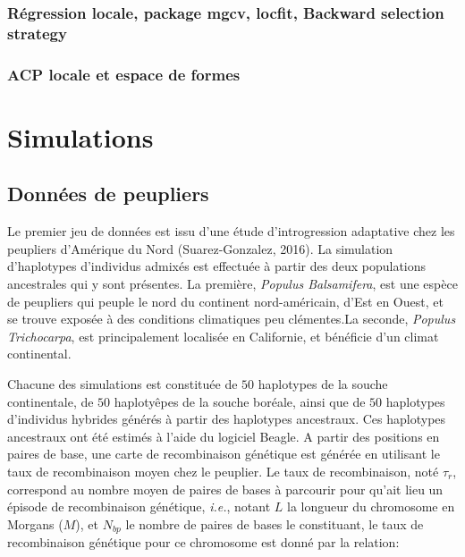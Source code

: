 \documentclass[12pt,twoside]{ugathesis}
\begin{document}
\subsubsection{Régression locale, package mgcv, locfit, Backward
selection
strategy}\label{regression-locale-package-mgcv-locfit-backward-selection-strategy}

\subsubsection{ACP locale et espace de
formes}\label{acp-locale-et-espace-de-formes}

\newpage

\section{Simulations}\label{simulations}

\subsection{Données de peupliers}\label{donnees-de-peupliers}

Le premier jeu de données est issu d'une étude d'introgression
adaptative chez les peupliers d'Amérique du Nord (Suarez-Gonzalez,
2016). La simulation d'haplotypes d'individus admixés est effectuée à
partir des deux populations ancestrales qui y sont présentes. La
première, \emph{Populus Balsamifera}, est une espèce de peupliers qui
peuple le nord du continent nord-américain, d'Est en Ouest, et se trouve
exposée à des conditions climatiques peu clémentes.La seconde,
\emph{Populus Trichocarpa}, est principalement localisée en Californie,
et bénéficie d'un climat continental.

Chacune des simulations est constituée de \(50\) haplotypes de la souche
continentale, de \(50\) haplotyêpes de la souche boréale, ainsi que de
\(50\) haplotypes d'individus hybrides générés à partir des haplotypes
ancestraux. Ces haplotypes ancestraux ont été estimés à l'aide du
logiciel Beagle. A partir des positions en paires de base, une carte de
recombinaison génétique est générée en utilisant le taux de
recombinaison moyen chez le peuplier. Le taux de recombinaison, noté
\(\tau_r\), correspond au nombre moyen de paires de bases à parcourir
pour qu'ait lieu un épisode de recombinaison génétique, \emph{i.e.},
notant \(L\) la longueur du chromosome en Morgans (\(M\)), et \(N_{bp}\)
le nombre de paires de bases le constituant, le taux de recombinaison
génétique pour ce chromosome est donné par la relation:
\end{document}
